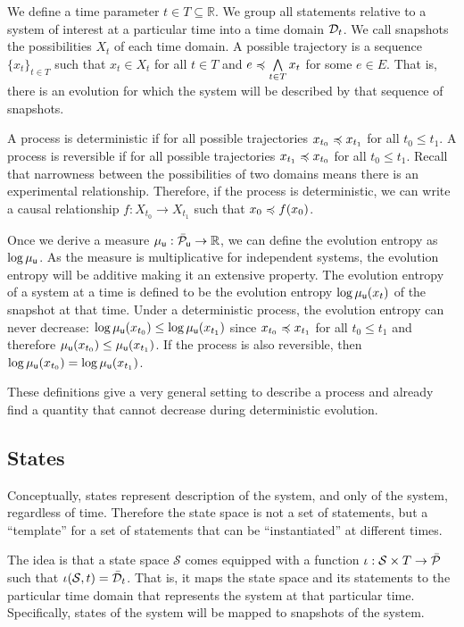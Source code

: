 \documentclass[11pt,letterpaper,fleqn]{memoir} %
\begin{document}
We define a time parameter $t \in T \subseteq \mathbb{R}$. We group all statements relative to a system of interest at a particular time into a time domain $\edomain_t$. We call snapshots the possibilities $X_t$ of each time domain. A possible trajectory is a sequence $\{x_t\}_{t \in T}$ such that $x_t \in X_t$ for all $t \in T$ and $e \narrower \bigAND\limits_{t \in T} x_t$ for some $e \in E$. That is, there is an evolution for which the system will be described by that sequence of snapshots.

A process is deterministic if for all possible trajectories $x_{t_0} \narrower x_{t_1}$ for all $t_0 \leq t_1$. A process is reversible if for all possible trajectories $x_{t_1} \narrower x_{t_0}$ for all $t_0 \leq t_1$. Recall that narrowness between the possibilities of two domains means there is an experimental relationship. Therefore, if the process is deterministic, we can write a causal relationship $f : X_{t_0} \to X_{t_1}$ such that $x_0 \narrower f(x_0)$.

Once we derive a measure $\mu_{\stmt[u]} : \tdomain[P]_{\stmt[u]} \to \mathbb{R}$, we can define the evolution entropy as $\log \mu_{\stmt[u]}$. As the measure is multiplicative for independent systems, the evolution entropy will be additive making it an extensive property. The evolution entropy of a system at a time is defined to be the evolution entropy $\log \mu_{\stmt[u]}(x_t)$ of the snapshot at that time. Under a deterministic process, the evolution entropy can never decrease: $\log \mu_{\stmt[u]}(x_{t_0}) \leq \log \mu_{\stmt[u]}(x_{t_1})$ since $x_{t_0} \narrower x_{t_1}$ for all $t_0 \leq t_1$ and therefore $\mu_{\stmt[u]}(x_{t_0}) \leq \mu_{\stmt[u]}(x_{t_1})$. If the process is also reversible, then $\log \mu_{\stmt[u]}(x_{t_0}) = \log \mu_{\stmt[u]}(x_{t_1})$.

These definitions give a very general setting to describe a process and already find a quantity that cannot decrease during deterministic evolution.

\subsection{States}

Conceptually, states represent description of the system, and only of the system, regardless of time. Therefore the state space is not a set of statements, but a ``template'' for a set of statements that can be ``instantiated'' at different times.

The idea is that a state space $\mathcal{S}$ comes equipped with a function $\iota : \mathcal{S} \times T \to \tdomain[P]$ such that $\iota(\mathcal{S}, t) = \tdomain_t$. That is, it maps the state space and its statements to the particular time domain that represents the system at that particular time. Specifically, states of the system will be mapped to snapshots of the system.
\end{document}
